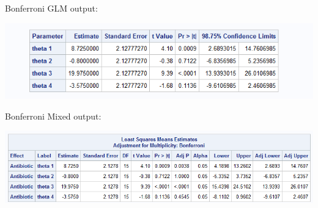 Bonferroni GLM output:
\begin{center}
\includegraphics[scale=0.8]{BindFracBon}
\end{center}
Bonferroni Mixed output:
\begin{center}
\includegraphics[scale=0.8]{BindFracBonMixed}
\end{center}

\newpage

